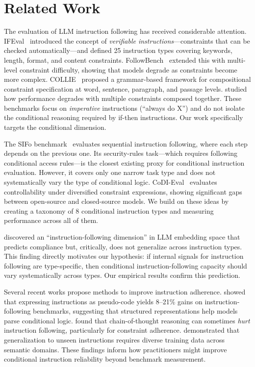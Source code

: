 \section{Related Work}
\label{sec:related}

The evaluation of LLM instruction following has received considerable attention. IFEval~\citep{zhou2023ifeval} introduced the concept of \emph{verifiable instructions}---constraints that can be checked automatically---and defined 25 instruction types covering keywords, length, format, and content constraints. FollowBench~\citep{jiang2023followbench} extended this with multi-level constraint difficulty, showing that models degrade as constraints become more complex. COLLIE~\citep{yao2023collie} proposed a grammar-based framework for compositional constraint specification at word, sentence, paragraph, and passage levels. \citet{qin2024benchmarking} studied how performance degrades with multiple constraints composed together. These benchmarks focus on \emph{imperative} instructions (``always do X'') and do not isolate the conditional reasoning required by if-then instructions. Our work specifically targets the conditional dimension.

The SIFo benchmark~\citep{chen2024sifo} evaluates sequential instruction following, where each step depends on the previous one. Its security-rules task---which requires following conditional access rules---is the closest existing proxy for conditional instruction evaluation. However, it covers only one narrow task type and does not systematically vary the type of conditional logic. CoDI-Eval~\citep{chen2024codieval} evaluates controllability under diversified constraint expressions, showing significant gaps between open-source and closed-source models. We build on these ideas by creating a taxonomy of 8 conditional instruction types and measuring performance across all of them.

\citet{heo2024llms} discovered an ``instruction-following dimension'' in LLM embedding space that predicts compliance but, critically, does not generalize across instruction types. This finding directly motivates our hypothesis: if internal signals for instruction following are type-specific, then conditional instruction-following capacity should vary systematically across types. Our empirical results confirm this prediction.

Several recent works propose methods to improve instruction adherence. \citet{kumar2025pseudocode} showed that expressing instructions as pseudo-code yields 8--21\% gains on instruction-following benchmarks, suggesting that structured representations help models parse conditional logic. \citet{wu2025thinking} found that chain-of-thought reasoning can sometimes \emph{hurt} instruction following, particularly for constraint adherence. \citet{zhang2024onlyif} demonstrated that generalization to unseen instructions requires diverse training data across semantic domains. These findings inform how practitioners might improve conditional instruction reliability beyond benchmark measurement.
